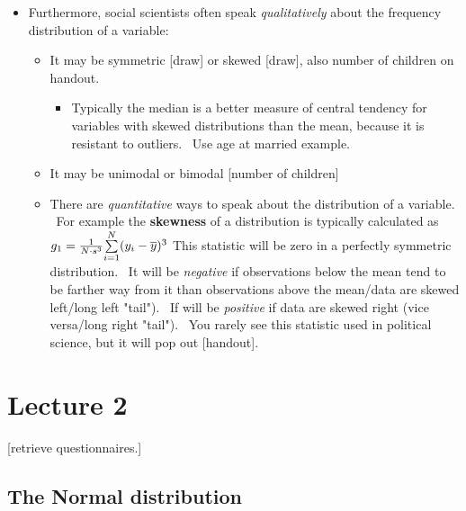 \documentclass[11pt]{article}
\begin{document}
\begin{itemize}
\begin{itemize}
\item Furthermore, social scientists often speak \textit{qualitatively}
about the frequency distribution of a variable:

\begin{itemize}
\item It may be symmetric [draw] or skewed [draw], also number of children
on handout.

\begin{itemize}
\item Typically the median is a better measure of central tendency for
variables with skewed distributions than the mean, because it is resistant
to outliers. \ Use age at married example.
\end{itemize}

\item It may be unimodal or bimodal [number of children]

\item There are \textit{quantitative }ways to speak about the distribution
of a variable. \ For example the \textbf{skewness} of a distribution is
typically calculated as $g_{1}=\frac{1}{N\cdot s^{3}}\overset{N}{\underset{%
i=1}{\sum }}(y_{i}-\overline{y})^{3}\ $This statistic will be zero in a
perfectly symmetric distribution. \ It will be \textit{negative }if
observations below the mean tend to be farther way from it than observations
above the mean/data are skewed left/long left "tail"). \ If will be \textit{%
positive }if data are skewed right (vice versa/long right "tail"). \ You
rarely see this statistic used in political science, but it will pop out
[handout].\newpage
\end{itemize}
\end{itemize}
\end{itemize}

\section{Lecture 2}

[retrieve questionnaires.]

\subsection{The Normal distribution}
\end{document}
